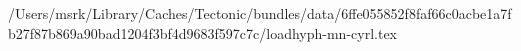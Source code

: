 /Users/msrk/Library/Caches/Tectonic/bundles/data/6ffe055852f8faf66c0acbe1a7fb27f87b869a90bad1204f3bf4d9683f597c7c/loadhyph-mn-cyrl.tex